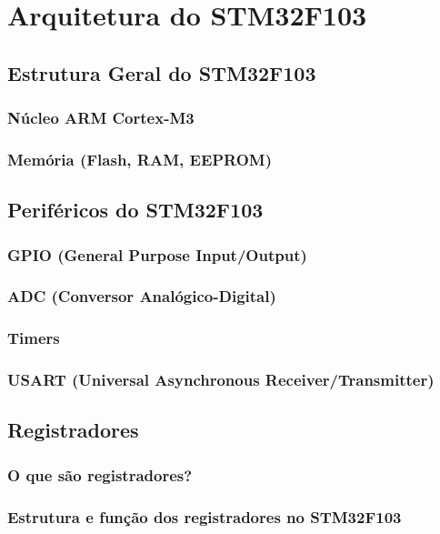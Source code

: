 \section{Arquitetura do STM32F103}

\subsection{Estrutura Geral do STM32F103}
\subsubsection{Núcleo ARM Cortex-M3}
\subsubsection{Memória (Flash, RAM, EEPROM)}

\subsection{Periféricos do STM32F103}
\subsubsection{GPIO (General Purpose Input/Output)}
\subsubsection{ADC (Conversor Analógico-Digital)}
\subsubsection{Timers}
\subsubsection{USART (Universal Asynchronous Receiver/Transmitter)}

\subsection{Registradores}
\subsubsection{O que são registradores?}
\subsubsection{Estrutura e função dos registradores no STM32F103}